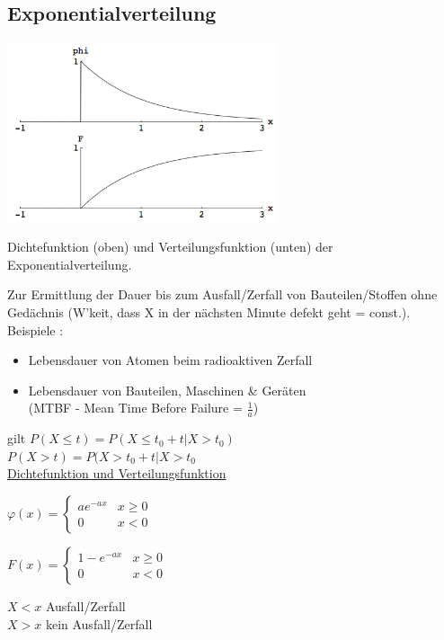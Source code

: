 	\subsection{Exponentialverteilung }
		\begin{floatingfigure}[r]{8cm}
        \includegraphics[width=8cm]{./bilder/exponentialverteilung.png}
        \caption{Dichtefunktion (oben) und Verteilungsfunktion (unten) der
        Exponentialverteilung.} 		
		\end{floatingfigure}

		Zur Ermittlung der Dauer bis zum Ausfall/Zerfall von Bauteilen/Stoffen ohne Gedächnis
		(W'keit, dass X in der nächsten Minute defekt geht = const.). Beispiele :
		\begin{itemize}
          \item Lebensdauer von Atomen beim radioaktiven Zerfall
          \item Lebensdauer von Bauteilen, Maschinen \& Geräten\\(MTBF -
          Mean Time Before Failure = $\frac{1}{a}$)
    \end{itemize}
    
    gilt $P(X \leq t) = P(X \leq t_0 + t | X > t_0)$\\
    $P(X > t) = P(X > t_0 + t | X > t_0$\\
    
		\underline{Dichtefunktion und Verteilungsfunktion}\\
    \begin{minipage}{5cm}
      $\varphi(x)=\begin{cases}
        a e^{-a x}  & x \geq 0\\
        0						& x < 0
      \end{cases}$
      
      $F(x)=\begin{cases}
        1-e^{-a x}  		& x \geq 0\\
        0	 					& x < 0
      \end{cases}$
    \end{minipage} 
    \begin{minipage}{4.5cm}
      $X < x$ Ausfall/Zerfall\\
      $X > x$ kein Ausfall/Zerfall
    \end{minipage}\\
    
